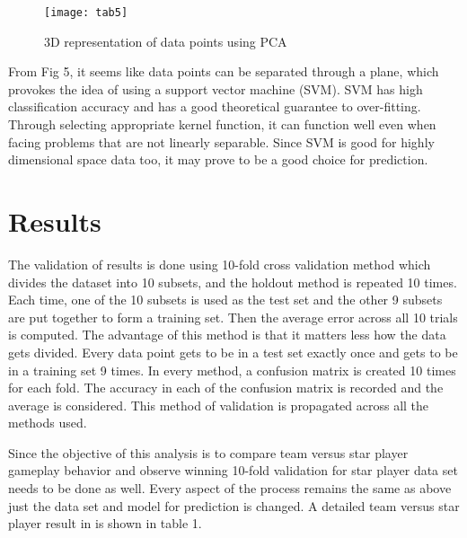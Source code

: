 \documentclass[conference]{IEEEtran}
\begin{document}
\begin{itemize}
\begin{figure}[!t]
\texttt{[image: tab5]}
\caption{3D representation of data points using PCA}
\end{figure}

 From Fig 5, it seems like data points can be separated through a plane, which provokes the idea of using a support vector machine (SVM). SVM has high classification accuracy and has a good theoretical guarantee to over-fitting. Through selecting appropriate kernel function, it can function well even when facing problems that are not linearly separable. Since SVM is good for highly dimensional space data too, it may prove to be a good choice for prediction.

\end{itemize}

\section{Results}

The validation of results is done using 10-fold cross validation method which divides the dataset into 10 subsets, and the holdout method is repeated 10 times. Each time, one of the 10 subsets is used as the test set and the other 9 subsets are put together to form a training set. Then the average error across all 10 trials is computed. The advantage of this method is that it matters less how the data gets divided. Every data point gets to be in a test set exactly once and gets to be in a training set 9 times. In every method, a confusion matrix is created 10 times for each fold. The accuracy in each of the confusion matrix is recorded and the average is considered. This method of validation is propagated across all the methods used.

Since the objective of this analysis is to compare team versus star player gameplay behavior and observe winning 10-fold validation for star player data set needs to be done as well. Every aspect of the process remains the same as above just the data set and model for prediction is changed.
A detailed team versus star player result in is shown in table 1.
\end{document}
